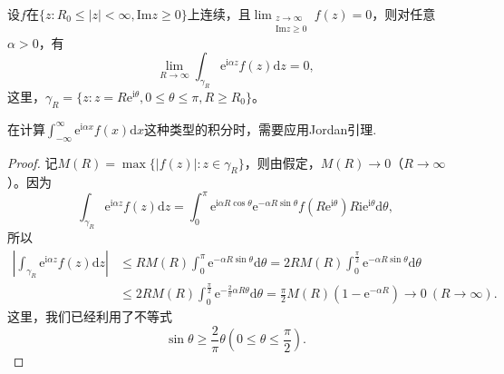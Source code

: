 \documentclass[../../main.tex]{subfiles}
\begin{document}
\begin{lemma}[Jordan引理]\label{lemma:Jordan引理}
设$f$在$\{ z: R_0 \leqslant |z| < \infty, \mathrm{Im} z \geqslant 0 \}$上连续，且$\lim_{\substack{z \to \infty \\ \mathrm{Im} z \geqslant 0}} f(z) = 0$，则对任意$\alpha > 0$，有
\[
\lim_{R \to \infty} \int_{\gamma_R} \mathrm{e}^{\mathrm{i}\alpha z} f(z) \mathrm{d}z = 0,
\]
这里，$\gamma_R = \{ z: z = R\mathrm{e}^{\mathrm{i}\theta}, 0 \leqslant \theta \leqslant \pi, R \geqslant R_0 \}$。
\end{lemma}
\begin{remark}
在计算$\int_{-\infty}^{\infty} \mathrm{e}^{\mathrm{i}\alpha x} f(x) \mathrm{d}x$这种类型的积分时，需要应用Jordan引理.
\end{remark}
\begin{proof}
记$M(R) = \max\{ |f(z)| : z \in \gamma_R \}$，则由假定，$M(R) \to 0$（$R \to \infty$）。因为
\[
\int_{\gamma_R} \mathrm{e}^{\mathrm{i}\alpha z} f(z) \mathrm{d}z = \int_{0}^{\pi} \mathrm{e}^{\mathrm{i}\alpha R\cos\theta} \mathrm{e}^{-\alpha R\sin\theta} f(R\mathrm{e}^{\mathrm{i}\theta}) R\mathrm{i}\mathrm{e}^{\mathrm{i}\theta} \mathrm{d}\theta,
\]
所以
\begin{align*}
\left| \int_{\gamma_R} \mathrm{e}^{\mathrm{i}\alpha z} f(z) \mathrm{d}z \right| &\leqslant R M(R) \int_{0}^{\pi} \mathrm{e}^{-\alpha R\sin\theta} \mathrm{d}\theta
= 2 R M(R) \int_{0}^{\frac{\pi}{2}} \mathrm{e}^{-\alpha R\sin\theta} \mathrm{d}\theta
\\
&\leqslant 2 R M(R) \int_{0}^{\frac{\pi}{2}} \mathrm{e}^{-\frac{2}{\pi}\alpha R\theta} \mathrm{d}\theta
= \frac{\pi}{2} M(R) (1 - \mathrm{e}^{-\alpha R})
\to 0 \ (R \to \infty).
\end{align*}
这里，我们已经利用了不等式
\[
\sin\theta \geqslant \frac{2}{\pi}\theta \left( 0 \leqslant \theta \leqslant \frac{\pi}{2} \right).
\]

\end{proof}
\end{document}
